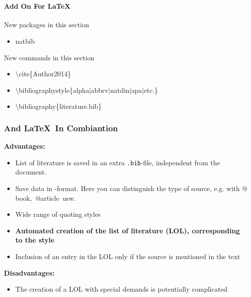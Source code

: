 \section{\BibTeX}
\begin{frame}
\frametitle{\BibTeX}
\framesubtitle{Add On For \LaTeX}
\begin{exampleblock}{New packages in this section}
\begin{itemize}
\item natbib
\end{itemize}
\end{exampleblock}

\begin{block}{New commands in this section}
\begin{itemize}
\item \color{nounibaredI}\textbackslash cite\color{black}\{Author2014\}
\item \color{nounibaredI}\textbackslash bibliographystyle\color{black}\{alpha$\mid$abbrv$\mid$natdin$\mid$apa$\mid$etc.\}
\item \color{nounibaredI}\textbackslash bibliography\color{black}\{literature.bib\}
\end{itemize}
\end{block}
\end{frame}

\begin{frame}
\frametitle{\BibTeX And \LaTeX ~In Combiantion}
\textbf{Advantages:}
\begin{itemize}
\item List of literature is saved in an extra \texttt{.bib}-file, independent from the document.
\item Save data in \BibTeX -format. Here you can distinguish the type of source, e.g. with \color{nounibaredI}$@$book\color{black},~\color{nounibaredI}$@$article\color{black}~usw.
\item Wide range of quoting styles
\item \textbf{Automated creation of the list of literature (LOL), corresponding to the style}
\item Inclusion of an entry in the LOL only if the source is mentioned in the text
\end{itemize}
\textbf{Disadvantages:}
\begin{itemize}
\item The creation of a LOL with special demands is potentially complicated
\end{itemize}
\end{frame}

